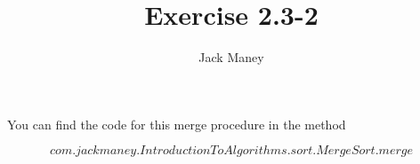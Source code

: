 \documentclass{article}
\begin{document}
\title{Exercise 2.3-2}
\author{Jack Maney}
\maketitle

You can find the code for this merge procedure in the method 

\[
	com.jackmaney.IntroductionToAlgorithms.sort.MergeSort.merge
\]
\end{document}
